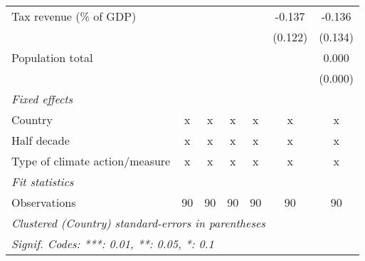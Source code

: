 \begin{tabular}{lcccccc}
   Tax revenue (\% of GDP)                      &                   &                   &                    &                    & -0.137             & -0.136\\   
                                                &                   &                   &                    &                    & (0.122)            & (0.134)\\   
   Population total                             &                   &                   &                    &                    &                    & 0.000\\   
                                                &                   &                   &                    &                    &                    & (0.000)\\   
   \emph{Fixed effects}\\
   Country                                      & x                 & x                 & x                  & x                  & x                  & x\\  
   Half decade                                  & x                 & x                 & x                  & x                  & x                  & x\\  
   Type of climate action/measure               & x                 & x                 & x                  & x                  & x                  & x\\  
   \midrule \emph{Fit statistics}\\
   Observations                                 & 90                & 90                & 90                 & 90                 & 90                 & 90\\  
   \midrule
   \multicolumn{7}{l}{\emph{Clustered (Country) standard-errors in parentheses}}\\
   \multicolumn{7}{l}{\emph{Signif. Codes: ***: 0.01, **: 0.05, *: 0.1}}\\
\end{tabular}
\par\endgroup


